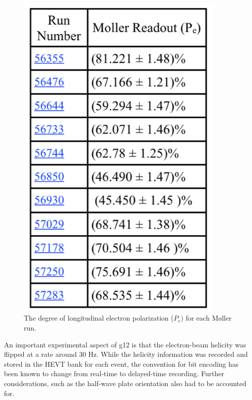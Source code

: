 \begin{figure}[h]
\begin{center}
 \includegraphics[width=0.9\textwidth]{figures/calib/pol/moltable.png}
  \caption{The degree of longitudinal electron polarization ($P_e)$ for each M{\o}ller run. }
  \label{moltable}
  \end{center}
\end{figure}



An important experimental aspect of g12 is that the electron-beam helicity was flipped at a rate around 30 Hz. While the helicity information was recorded and stored in the HEVT bank for each event, the convention for bit encoding has been known to change from real-time to delayed-time recording. Further considerations, such as the half-wave plate orientation also had to be accounted for.

